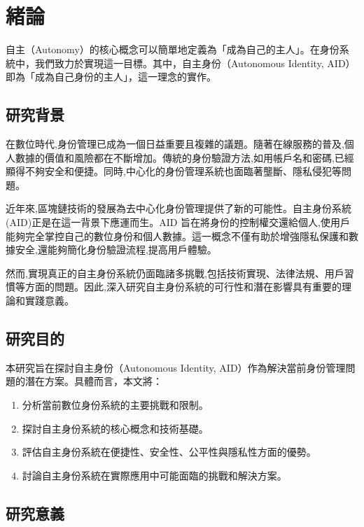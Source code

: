 
\chapter{緒論}

自主（Autonomy）的核心概念可以簡單地定義為「成為自己的主人」。在身份系統中，我們致力於實現這一目標。其中，自主身份（Autonomous Identity, AID）即為「成為自己身份的主人」，這一理念的實作。

\section{研究背景}

在數位時代,身份管理已成為一個日益重要且複雜的議題。隨著在線服務的普及,個人數據的價值和風險都在不斷增加。傳統的身份驗證方法,如用帳戶名和密碼,已經顯得不夠安全和便捷。同時,中心化的身份管理系統也面臨著壟斷、隱私侵犯等問題。

近年來,區塊鏈技術的發展為去中心化身份管理提供了新的可能性。自主身份系統(AID)正是在這一背景下應運而生。AID 旨在將身份的控制權交還給個人,使用戶能夠完全掌控自己的數位身份和個人數據。這一概念不僅有助於增強隱私保護和數據安全,還能夠簡化身份驗證流程,提高用戶體驗。

然而,實現真正的自主身份系統仍面臨諸多挑戰,包括技術實現、法律法規、用戶習慣等方面的問題。因此,深入研究自主身份系統的可行性和潛在影響具有重要的理論和實踐意義。

\section{研究目的}

本研究旨在探討自主身份（Autonomous Identity, AID）作為解決當前身份管理問題的潛在方案。具體而言，本文將：

\begin{enumerate}
  \item 分析當前數位身份系統的主要挑戰和限制。
  \item 探討自主身份系統的核心概念和技術基礎。
  \item 評估自主身份系統在便捷性、安全性、公平性與隱私性方面的優勢。
  \item 討論自主身份系統在實際應用中可能面臨的挑戰和解決方案。
\end{enumerate}

\section{研究意義}

